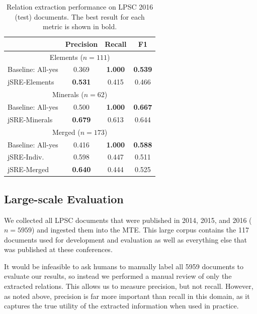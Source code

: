 \documentclass[letterpaper]{article} %
\begin{document}

\begin{table}
\caption{Relation extraction performance on LPSC 2016 (test) documents. 
The best result for each metric is shown in bold.}
\label{tab:re}
\begin{center}
\begin{tabular}{l|ccc}
 & Precision & Recall & F1 \\ \hline
\multicolumn{4}{c}{Elements ($n=111$)} \\
Baseline: All-yes & 0.369 & {\bf 1.000} & {\bf 0.539} \\ 
jSRE-Elements & {\bf 0.531} & 0.415 & 0.466 \\ \hline
\multicolumn{4}{c}{Minerals ($n=62$)} \\
Baseline: All-yes & 0.500 & {\bf 1.000} & {\bf 0.667} \\ 
jSRE-Minerals & {\bf 0.679} & 0.613 & 0.644 \\ \hline 
\multicolumn{4}{c}{Merged ($n=173$)} \\
Baseline: All-yes & 0.416 & {\bf 1.000} & {\bf 0.588} \\ 
jSRE-Indiv.  & 0.598 & 0.447 & 0.511 \\
jSRE-Merged  & {\bf 0.640} & 0.444 & 0.525 \\ \hline
\end{tabular}
\end{center}
\end{table}


\subsection{Large-scale Evaluation}

We collected all LPSC documents that were published in 2014, 2015, and
2016 ($n=5959$) and ingested them into the MTE.  This large corpus
contains the 117 documents used for development and evaluation as well
as everything else that was published at these conferences.


It would be infeasible to ask humans to manually label all 5959
documents to evaluate our results, so instead we performed a manual
review of only the extracted relations.  This allows us to measure
precision, but not recall.  However, as noted above, precision is far more
important than recall in this domain, as it captures the true utility
of the extracted information when used in practice.
\end{document}
